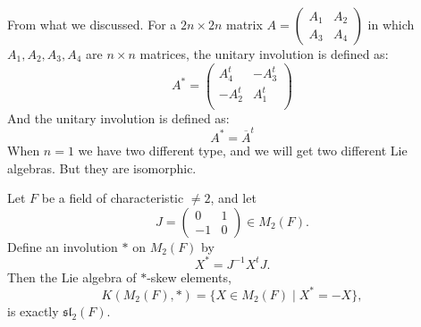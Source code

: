 \begin{example}
    From what we discussed. For a $2n \times 2n$ matrix $ A =\begin{pmatrix} A_1 & A_2 \\ A_3 & A_4 \end{pmatrix}$ in which $ A_1, A_2, A_3, A_4 $ are $ n \times n $ matrices, the unitary involution is defined as:
    \[
        A^*=
        \begin{pmatrix}
            A_4^t  & -A_3^t \\
            -A_2^t & A_1^t  \\
        \end{pmatrix}
    \]
    And the unitary involution is defined as:
    \[
        A^*=\overline{A}^t
    \]
    When $n=1$ we have two different type, and we will get two different Lie algebras. But they are isomorphic.
\end{example}

\begin{proposition}
    Let $F$ be a field of characteristic $\neq 2$, and let
    \[
        J=\begin{pmatrix}0&1\\-1&0\end{pmatrix}\in M_{2}(F).
    \]
    Define an involution $*$ on $M_{2}(F)$ by
    \[
        X^{*}=J^{-1}X^{t}J .
    \]
    Then the Lie algebra of $*$-skew elements,
    \[
        K(M_{2}(F),*)=\{X\in M_{2}(F)\mid X^{*}=-X\},
    \]
    is exactly $\mathfrak{sl}_{2}(F)$.
\end{proposition}

